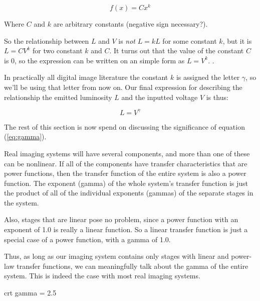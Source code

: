 \begin{equation*}
  f(x) = Cx^k
\end{equation*}

Where $C$ and $k$ are arbitrary constants (negative sign necessary?)\cite{newman05power,easley2010networks_powerlaw}.

So the relationship between $L$ and $V$ is \textit{not} $L = kL$ for
some constant $k$, but it is $L = CV^k$ for two constant $k$ and
$C$. It turns out that the value of the constant $C$ is $0$, so the
expression can be written on an simple form as $L =
V^k$. \cite{motta1991analytical_crt,Pascale2003_ReviewRGBColourSpaces,boutel:_png_portab_networ_graph_specif_version1,boutel:_png_portab_networ_graph_specif_version11,boutel:_png_portab_networ_graph_specif_version12,roelofs99:_png}.

In practically all digital image literature the constant $k$ is
assigned the letter $\gamma$, so we'll be using that letter from now
on. Our final expression for describing the relationship the emitted
luminosity $L$ and the inputted voltage $V$ is thus:

\begin{equation}
  \label{eq:gamma}
  L = V^\gamma
\end{equation}

The rest of this section is now spend on discussing the significance
of equation (\ref{eq:gamma}).

Real imaging systems will have several components, and more than one
of these can be nonlinear. If all of the components have transfer
characteristics that are power functions, then the transfer function
of the entire system is also a power function. The exponent (gamma) of
the whole system's transfer function is just the product of all of the
individual exponents (gammas) of the separate stages in the system.

Also, stages that are linear pose no problem, since a power function
with an exponent of 1.0 is really a linear function. So a linear
transfer function is just a special case of a power function, with a
gamma of 1.0.

Thus, as long as our imaging system contains only stages with linear
and power-law transfer functions, we can meaningfully talk about the
gamma of the entire system. This is indeed the case with most real
imaging systems.

crt gamma = 2.5


